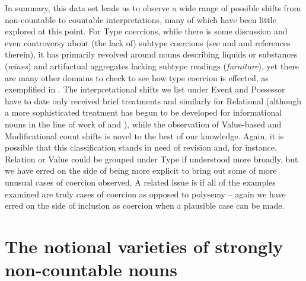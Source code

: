 \documentclass[output=paper]{langscibook}
\begin{document}
In summary, this data set leads us to observe a wide range of possible shifts  from non-countable to countable interpretations, many of which have been little explored at this point.  %
For Type coercions, while there is some discussion and even controversy about (the lack of) subtype coercions (see \citealt{grimm2016artifact} and \citealt{sutton2016counting} and references therein), it has primarily revolved around nouns describing liquids or substances (\textit{wines}) and artifactual aggregates lacking subtype readings (\textit{furniture}), yet there are many other domains to check to see how type coercion is effected, as exemplified  in .   The interpretational shifts we list under Event and Possessor have to date only received brief treatments \citep{grimm2014individuating, ZamparelliToAppear, Husic2020} and similarly for Relational \citep{grimm2014individuating} (although a more sophisticated treatment has begun to be developed for informational nouns in the line of work of \citealt{sutton2019singular} and \citealt{Sutton_Filip_2020}), while the observation of Value-based and Modificational count shifts is novel to the best of our knowledge.  Again, it is possible that this classification stands in need of revision and, for instance, Relation or Value could be grouped under Type if understood more broadly, but we have erred on the side of being more explicit to bring out some of more unusual cases of coercion observed.  A related issue is if all of the examples examined are truly cases of coercion as opposed to polysemy -- again we have erred on the side of inclusion as coercion when a plausible case can be made.

\section{The notional varieties of strongly non-countable nouns}\label{gri-ric:sec:notional}  
\end{document}
